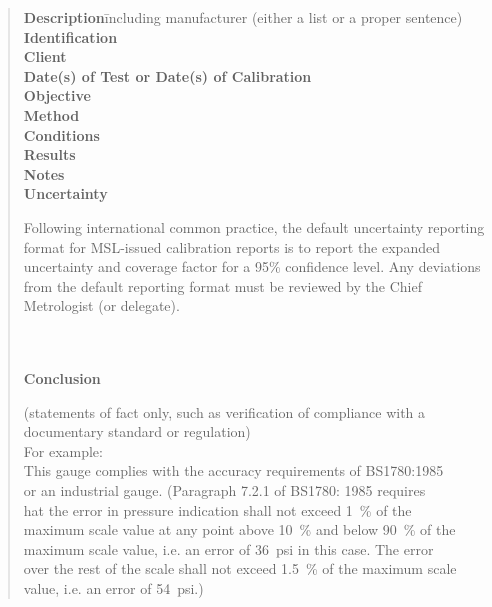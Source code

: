 \begin{quote}
\begin{tabbing}
\textbf{Description}\hspace{12mm}\=including manufacturer (either a list or a proper sentence)\\[\baselineskip]

\textbf{Identification}\mbox{}\\[\baselineskip]

\textbf{Client}\mbox{}\\[\baselineskip]

\textbf{Date(s) of Test or Date(s) of Calibration}\mbox{}\\[\baselineskip]

\textbf{Objective}\mbox{}\\[\baselineskip]

\textbf{Method}\mbox{}\\[\baselineskip]

\textbf{Conditions}\mbox{}\\[\baselineskip]

\textbf{Results}\mbox{}\\[\baselineskip]

\textbf{Notes}\mbox{}\\[\baselineskip]

\textbf{Uncertainty}\>\begin{minipage}[t]{.7\textwidth}
Following international common practice, the default uncertainty reporting format for MSL-issued calibration reports is to report the expanded uncertainty and coverage factor for a 95\% confidence level. Any deviations from the default reporting format must be reviewed by the Chief Metrologist (or delegate).
\end{minipage}

\\

\\

\textbf{Conclusion}\>\begin{minipage}[t]{.7\textwidth}
(statements of fact only, such as verification of compliance with a documentary standard or regulation)\\[\baselineskip]
For example:\\

This gauge complies with the accuracy requirements of BS1780:1985\\ or an industrial gauge. (Paragraph 7.2.1 of BS1780: 1985 requires\\ hat the error in pressure indication shall not exceed \SI{1}{\%} of the\\ 
maximum scale value at any point above \SI{10}{\%} and below \SI{90}{\%} of the \\
maximum scale value, i.e. an error of \SI{36}{psi} in this case. The error\\ 
over the rest of the scale shall not exceed \SI{1.5}{\%} of the maximum scale\\ 
value, i.e. an error of \SI{54}{psi}.)\\


\end{minipage}
\end{tabbing}
\end{quote}
